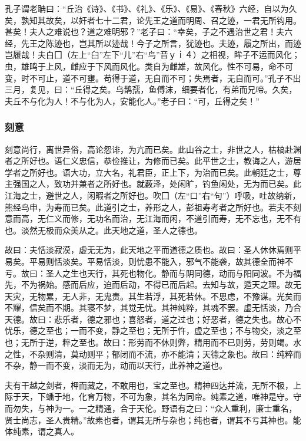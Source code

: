 \documentclass[]{article}
\begin{document}
孔子谓老聃曰：``丘治《诗》、《书》、《礼》、《乐》、《易》、《春秋》六经，自以为久矣，孰知其故矣，以奸者七十二君，论先王之道而明周、召之迹，一君无所钩用。甚矣！夫人之难说也？道之难明邪？''老子曰：``幸矣，子之不遇治世之君！夫六经，先王之陈迹也，岂其所以迹哉！今子之所言，犹迹也。夫迹，履之所出，而迹岂履哉！夫白囗（左上``臼''左下``儿''右``鸟''音ｙｉ４）之相视，眸子不运而风化；虫，雄鸣于上风，雌应于下风而风化。类自为雌雄，故风化。性不可易，命不可变，时不可止，道不可壅。苟得于道，无自而不可；失焉者，无自而可。''孔子不出三月，复见，曰：``丘得之矣。乌鹊孺，鱼傅沫，细要者化，有弟而兄啼。久矣，夫丘不与化为人！不与化为人，安能化人。''老子曰：``可，丘得之矣！''

\hypertarget{header-n276}{%
\subsubsection{刻意}\label{header-n276}}

刻意尚行，离世异俗，高论怨诽，为亢而已矣。此山谷之士，非世之人，枯槁赴渊者之所好也。语仁义忠信，恭俭推让，为修而已矣。此平世之士，教诲之人，游居学者之所好也。语大功，立大名，礼君臣，正上下，为治而已矣。此朝廷之士，尊主强国之人，致功并兼者之所好也。就薮泽，处闲旷，钓鱼闲处，无为而已矣。此江海之士，避世之人，闲暇者之所好也。吹囗（左``口''右``句''）呼吸，吐故纳新，熊经鸟申，为寿而已矣。此道引之士，养形之人，彭祖寿考者之所好也。若夫不刻意而高，无仁义而修，无功名而治，无江海而闲，不道引而寿，无不忘也，无不有也。淡然无极而众美从之。此天地之道，圣人之德也。

故曰：夫恬淡寂漠，虚无无为，此天地之平而道德之质也。故曰：圣人休休焉则平易矣。平易则恬淡矣。平易恬淡，则忧患不能入，邪气不能袭，故其德全而神不亏。故曰：圣人之生也天行，其死也物化。静而与阴同德，动而与阳同波。不为福先，不为祸始。感而后应，迫而后动，不得已而后起。去知与故，遁天之理。故无天灾，无物累，无人非，无鬼责。其生若浮，其死若休。不思虑，不豫谋。光矣而不耀，信矣而不期。其寝不梦，其觉无忧。其神纯粹，其魂不罢。虚无恬淡，乃合天德。故曰：悲乐者，德之邪也；喜怒者，道之过也；好恶者，德之失也。故心不忧乐，德之至也；一而不变，静之至也；无所于忤，虚之至也；不与物交，淡之至也；无所于逆，粹之至也。故曰：形劳而不休则弊，精用而不已则劳，劳则竭。水之性，不杂则清，莫动则平；郁闭而不流，亦不能清；天德之象也。故曰：纯粹而不杂，静一而不变，淡而无为，动而以天行，此养神之道也。

夫有干越之剑者，柙而藏之，不敢用也，宝之至也。精神四达并流，无所不极，上际于天，下蟠于地，化育万物，不可为象，其名为同帝。纯素之道，唯神是守。守而勿失，与神为一。一之精通，合于天伦。野语有之曰：``众人重利，廉士重名，贤士尚志，圣人贵精。''故素也者，谓其无所与杂也；纯也者，谓其不亏其神也。能体纯素，谓之真人。
\end{document}
